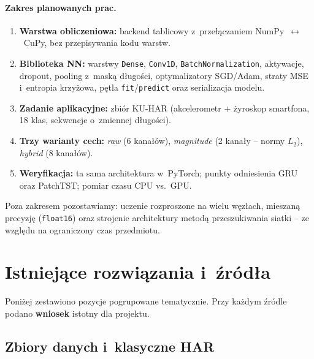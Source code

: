 \documentclass[12pt,a4paper]{article}
\begin{document}
\paragraph{Zakres planowanych prac.}
\begin{enumerate}[leftmargin=1.4em, itemsep=0.25em]
  \item \textbf{Warstwa obliczeniowa:} backend tablicowy z~przełączaniem NumPy~$\leftrightarrow$~CuPy, bez przepisywania kodu warstw.
  \item \textbf{Biblioteka NN:} warstwy \texttt{Dense}, \texttt{Conv1D}, \texttt{BatchNormalization}, aktywacje, dropout, pooling z~maską długości, optymalizatory SGD/Adam, straty MSE i~entropia krzyżowa, pętla \texttt{fit}/\texttt{predict} oraz serializacja modelu.
  \item \textbf{Zadanie aplikacyjne:} zbiór KU-HAR (akcelerometr + żyroskop smartfona, 18 klas, sekwencje o~zmiennej długości).
  \item \textbf{Trzy warianty cech:} \textit{raw} (6 kanałów), \textit{magnitude} (2 kanały -- normy $L_2$), \textit{hybrid} (8 kanałów).
  \item \textbf{Weryfikacja:} ta sama architektura w~PyTorch; punkty odniesienia GRU oraz PatchTST; pomiar czasu CPU vs.\ GPU.
\end{enumerate}
Poza zakresem pozostawiamy: uczenie rozproszone na wielu węzłach, mieszaną precyzję (\texttt{float16}) oraz strojenie architektury metodą przeszukiwania siatki -- ze względu na ograniczony czas przedmiotu.

\section{Istniejące rozwiązania i~źródła}

Poniżej zestawiono pozycje pogrupowane tematycznie. Przy każdym źródle podano \textbf{wniosek} istotny dla projektu.

\subsection{Zbiory danych i~klasyczne HAR}
\end{document}

